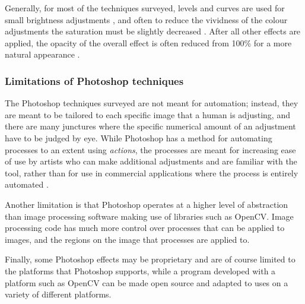 \begin{table}[H]
\begin{tabular}{|N||c|c|c|}
\begin{minipage}{.29\textwidth}
  \end{minipage} \\
    \hline
\end{tabular}
\end{table}

Generally, for most of the techniques surveyed, levels and curves are used for small brightness adjustments \cite{photoshop:obama, photoshop:match_body, photoshop:match_other}, and often to reduce the vividness of the colour adjustments the saturation must be slightly decreased \cite{photoshop:obama, photoshop:match_body}. After all other effects are applied, the opacity of the overall effect is often reduced from 100\% for a more natural appearance \cite{photoshop:obama, photoshop:match_body}.

\subsubsection*{Limitations of Photoshop techniques}
The Photoshop techniques surveyed are not meant for automation; instead, they are meant to be tailored to each specific image that a human is adjusting, and there are many junctures where the specific numerical amount of an adjustment have to be judged by eye. While Photoshop has a method for automating processes to an extent using \textit{actions}, the processes are meant for increasing ease of use by artists who can make additional adjustments and are familiar with the tool, rather than for use in commercial applications where the process is entirely automated \cite{photoshop:actions}.

Another limitation is that Photoshop operates at a higher level of abstraction than image processing software making use of libraries such as OpenCV. Image processing code has much more control over processes that can be applied to images, and the regions on the image that processes are applied to. 

Finally, some Photoshop effects may be proprietary and are of course limited to the platforms that Photoshop supports, while a program developed with a platform such as OpenCV can be made open source and adapted to uses on a variety of different platforms.
